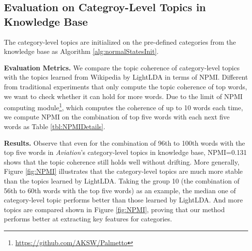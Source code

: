 \documentclass[runningheads,a4paper]{llncs}
\theoremstyle{exampstyle}
\begin{document}
\subsection{Evaluation on Categroy-Level Topics in Knowledge Base}
The category-level topics are initialized on the pre-defined categories from the knowledge base as Algorithm \ref{alg:normalStatesInit}.

\textbf{Evaluation Metrics.}
We compare the topic coherence of category-level topics with the topics learned from Wikipedia by LightLDA\cite{yuan2015lightlda} in terms of NPMI\cite{Rder2015ExploringTS}.
Different from traditional experiments that only compute the topic coherence of top words, we want to check whether  it can hold for more words.
Due to the limit of NPMI computing module\footnote{\url{https://github.com/AKSW/Palmetto}}, which computes the coherence of up to 10 words each time, we compute NPMI on the combination of top five words with each next five words as Table \ref{tbl:NPMIDetails}.

\textbf{Results.}
Observe that even for the combination of 96th to 100th words with the top five words in \textit{Aviation}'s category-level topics in knowledge base, NPMI=0.131 shows that the topic coherence still holds well without drifting.
More generally, Figure \ref{fig:NPMI} illustrates that the category-level topics are much more stable than the topics learned by LightLDA.
Taking the group 10 (the combination of 56th to 60th words with the top five words) as an example, the median one of category-level topic performs better than those learned by LightLDA. 
And more topics are compared shown in Figure \ref{fig:NPMI}, proving that our method performs better at extracting key features for categories.
\end{document}
